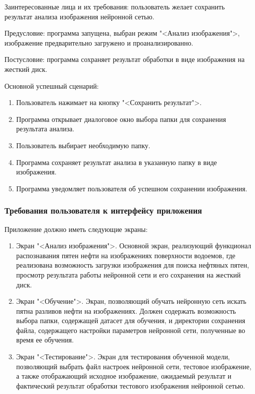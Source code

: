 Заинтересованные лица и их требования: пользователь желает сохранить результат анализа изображения нейронной сетью.

Предусловие: программа запущена, выбран режим "<Анализ изображения">, изображение предварительно загружено и проанализированно.

Постусловие: программа сохраняет результат обработки в виде изображения на жесткий диск.

Основной успешный сценарий:

\begin{enumerate}
	\item Пользователь нажимает на кнопку "<Сохранить результат">.
	\item Программа открывает диалоговое окно выбора папки для сохранения результата анализа.
	\item Пользователь выбирает необходимую папку.
	\item Программа сохраняет результат анализа в указанную папку в виде изображения.
	\item Программа уведомляет пользователя об успешном сохранении изображения.
\end{enumerate}

\subsubsection{Требования пользователя к интерфейсу приложения}

Приложение должно иметь следующие экраны:

\begin{enumerate}
	\item Экран "<Анализ изображения">. Основной экран, реализующий функционал распознавания пятен нефти на изображениях поверхности водоемов, где реализована возможность загрузки изображения для поиска нефтяных пятен, просмотр результата работы нейронной сети и его сохранения на жесткий диск.
	\item Экран "<Обучение">. Экран, позволяющий обучать нейронную сеть искать пятна разливов нефти на изображениях. Должен содержать возможность выбора папки, содержащей датасет для обучения, и директории сохранения файла, содержащего настройки параметров нейронной сети, полученные во время ее обучения.
	\item Экран "<Тестирование">. Экран для тестирования обученной модели, позволяющий выбрать файл настроек нейронной сети, тестовое изображение, а также отображающий исходное изображение, ожидаемый результат и фактический результат обработки тестового изображения нейронной сетью.
\end{enumerate}


